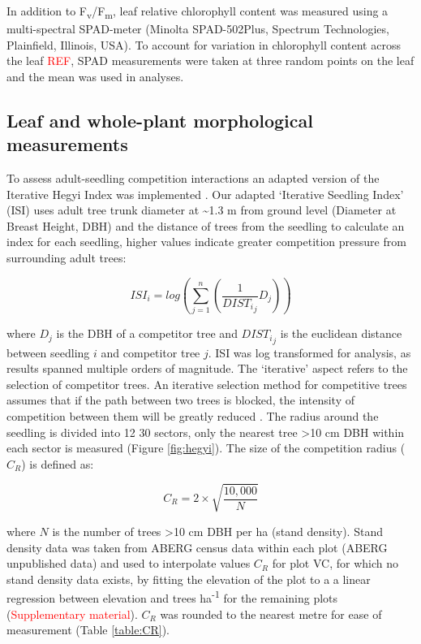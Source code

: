 \documentclass[a4paper,11pt]{article}
\newcommand{\todo}[1]{\textcolor{red}{#1}}   %
\begin{document}
In addition to F\textsubscript{v}/F\textsubscript{m}, leaf relative chlorophyll content was measured using a multi-spectral SPAD-meter (Minolta SPAD-502Plus, Spectrum Technologies, Plainfield, Illinois, USA). To account for variation in chlorophyll content across the leaf \todo{REF}, SPAD measurements were taken at three random points on the leaf and the mean was used in analyses. 

\subsection*{Leaf and whole-plant morphological measurements}

To assess adult-seedling competition interactions an adapted version of the Iterative Hegyi Index was implemented \citep{Hegyi1974, Lee2004, Seifert2014}. Our adapted `Iterative Seedling Index' (ISI) uses adult tree trunk diameter at \textasciitilde 1.3 m from ground level (Diameter at Breast Height, DBH) and the distance of trees from the seedling to calculate an index for each seedling, higher values indicate greater competition pressure from surrounding adult trees:

\begin{equation}
\label{eq:ISI}
ISI_i = log(\sum_{j=1}^n (\frac{1}{{DIST_i}_j} D_j))
\end{equation}

where $D_j$ is the DBH of a competitor tree and ${{DIST_i}_j}$ is the euclidean distance between seedling $i$ and competitor tree $j$. ISI was log transformed for analysis, as results spanned multiple orders of magnitude. The `iterative' aspect refers to the selection of competitor trees. An iterative selection method for competitive trees assumes that if the path between two trees is blocked, the intensity of competition between them will be greatly reduced \citep{Gadow1999}. The radius around the seedling is divided into 12 30\textdegree{} sectors, only the nearest tree \textgreater{}10 cm DBH within each sector is measured (Figure \ref{fig:hegyi}). The size of the competition radius ($C_R$) is defined as:

\begin{equation}
\label{eq:CR}
C_R = 2 \times \sqrt{\frac{10,000}{N}}
\end{equation}

where $N$ is the number of trees \textgreater10 cm DBH per ha (stand density). Stand density data was taken from ABERG census data within each plot (ABERG unpublished data) and used to interpolate values $C_R$ for plot VC, for which no stand density data exists, by fitting the elevation of the plot to a a linear regression between elevation and trees ha\textsuperscript{-1} for the remaining plots (\todo{Supplementary material}). $C_R$ was rounded to the nearest metre for ease of measurement (Table \ref{table:CR}). 
\end{document}
